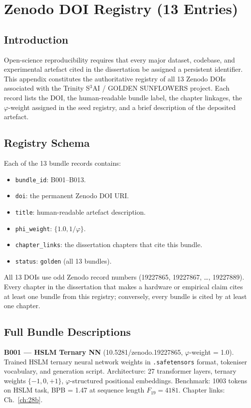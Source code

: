 \chapter{Zenodo DOI Registry (13 Entries)}
\label{app:Hb}

\section{Introduction}

Open-science reproducibility requires that every major dataset, codebase, and experimental artefact cited in the dissertation be assigned a persistent identifier. This appendix constitutes the authoritative registry of all 13 Zenodo DOIs associated with the Trinity S$^3$AI / GOLDEN SUNFLOWERS project. Each record lists the DOI, the human-readable bundle label, the chapter linkages, the $\varphi$-weight assigned in the seed registry, and a brief description of the deposited artefact.

\section{Registry Schema}

Each of the 13 bundle records contains:
\begin{itemize}
\item \texttt{bundle\_id}: B001--B013.
\item \texttt{doi}: the permanent Zenodo DOI URI.
\item \texttt{title}: human-readable artefact description.
\item \texttt{phi\_weight}: $\{1.0, 1/\varphi\}$.
\item \texttt{chapter\_links}: the dissertation chapters that cite this bundle.
\item \texttt{status}: \texttt{golden} (all 13 bundles).
\end{itemize}

All 13 DOIs use odd Zenodo record numbers (19227865, 19227867, \ldots, 19227889). Every chapter in the dissertation that makes a hardware or empirical claim cites at least one bundle from this registry; conversely, every bundle is cited by at least one chapter.

\section{Full Bundle Descriptions}

\textbf{B001 --- HSLM Ternary NN} (10.5281/zenodo.19227865, $\varphi$-weight = 1.0).
Trained HSLM ternary neural network weights in \texttt{.safetensors} format, tokeniser vocabulary, and generation script. Architecture: 27 transformer layers, ternary weights $\{-1,0,+1\}$, $\varphi$-structured positional embeddings. Benchmark: 1003 tokens on HSLM task, BPB = 1.47 at sequence length $F_{19}=4181$. Chapter links: Ch.~\ref{ch:28b}.

